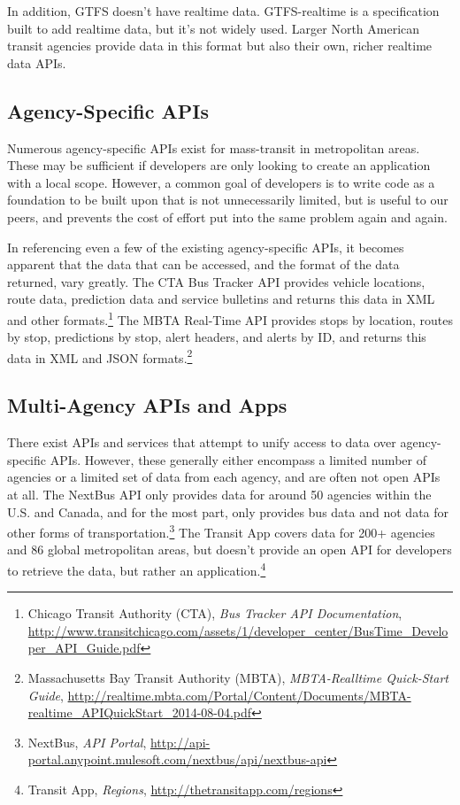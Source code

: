 \documentclass[12pt]{article}
\begin{document}
In addition, GTFS doesn't have realtime data. GTFS-realtime is a specification built to add
realtime data, but it's not widely used. Larger North American transit agencies provide
data in this format but also their own, richer realtime data APIs.

\subsection{Agency-Specific APIs}

Numerous agency-specific APIs exist for mass-transit in metropolitan areas.
These may be sufficient if developers are only looking to create an application with a local scope. However,
a common goal of developers is to write code as a foundation to be built upon that is not unnecessarily limited,
but is useful to our peers, and prevents the cost of effort put into the same
problem again and again.

In referencing even a few of the existing agency-specific APIs, it
becomes apparent that the data that can be accessed, and the format of the data returned, 
vary greatly. The CTA Bus Tracker API provides vehicle locations, route data, prediction data and 
service bulletins and returns this data in XML and other formats.\footnote{Chicago Transit Authority (CTA), \textit{Bus Tracker API Documentation},
\url{http://www.transitchicago.com/assets/1/developer\_center/BusTime\_Developer\_API\_Guide.pdf}} The MBTA Real-Time API provides
stops by location, routes by stop, predictions by stop, alert headers, and alerts by ID, and returns
this data in XML and JSON formats.\footnote{Massachusetts Bay Transit Authority (MBTA), \textit{MBTA-Realltime Quick-Start Guide},
\url{http://realtime.mbta.com/Portal/Content/Documents/MBTA-realtime\_APIQuickStart\_2014-08-04.pdf}}

\subsection{Multi-Agency APIs and Apps}
There exist APIs and services that attempt to unify access to data over agency-specific APIs.
However, these generally either encompass a limited number of agencies or a limited set of
data from each agency, and are often not open APIs at all. The NextBus API only provides data for
around 50 agencies within the U.S. and Canada, and for the most part, only provides bus data 
and not data for other forms of transportation.\footnote{NextBus, \textit{API Portal}, \url{http://api-portal.anypoint.mulesoft.com/nextbus/api/nextbus-api}} The Transit App covers data for 200+ agencies
and 86 global metropolitan areas, but doesn't provide an open API for developers to retrieve the
data, but rather an application.\footnote{Transit App, \textit{Regions}, \url{http://thetransitapp.com/regions}}
\end{document}
